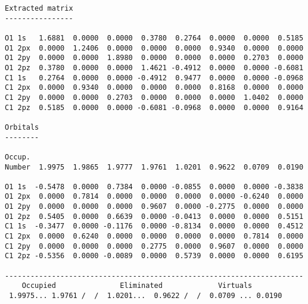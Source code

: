 \begin{verbatim}
Extracted matrix
----------------

O1 1s   1.6881  0.0000  0.0000  0.3780  0.2764  0.0000  0.0000  0.5185
O1 2px  0.0000  1.2406  0.0000  0.0000  0.0000  0.9340  0.0000  0.0000
O1 2py  0.0000  0.0000  1.8980  0.0000  0.0000  0.0000  0.2703  0.0000
O1 2pz  0.3780  0.0000  0.0000  1.4621 -0.4912  0.0000  0.0000 -0.6081
C1 1s   0.2764  0.0000  0.0000 -0.4912  0.9477  0.0000  0.0000 -0.0968
C1 2px  0.0000  0.9340  0.0000  0.0000  0.0000  0.8168  0.0000  0.0000
C1 2py  0.0000  0.0000  0.2703  0.0000  0.0000  0.0000  1.0402  0.0000
C1 2pz  0.5185  0.0000  0.0000 -0.6081 -0.0968  0.0000  0.0000  0.9164

Orbitals
--------
 
Occup.
Number  1.9975  1.9865  1.9777  1.9761  1.0201  0.9622  0.0709  0.0190
  
O1 1s  -0.5478  0.0000  0.7384  0.0000 -0.0855  0.0000  0.0000 -0.3838
O1 2px  0.0000  0.7814  0.0000  0.0000  0.0000  0.0000 -0.6240  0.0000
O1 2py  0.0000  0.0000  0.0000  0.9607  0.0000 -0.2775  0.0000  0.0000
O1 2pz  0.5405  0.0000  0.6639  0.0000 -0.0413  0.0000  0.0000  0.5151
C1 1s  -0.3477  0.0000 -0.1176  0.0000 -0.8134  0.0000  0.0000  0.4512
C1 2px  0.0000  0.6240  0.0000  0.0000  0.0000  0.0000  0.7814  0.0000
C1 2py  0.0000  0.0000  0.0000  0.2775  0.0000  0.9607  0.0000  0.0000
C1 2pz -0.5356  0.0000 -0.0089  0.0000  0.5739  0.0000  0.0000  0.6195

----------------------------------------------------------------------
    Occupied               Eliminated             Virtuals
 1.9975... 1.9761 /  /  1.0201...  0.9622 /  /  0.0709 ... 0.0190
\end{verbatim}
